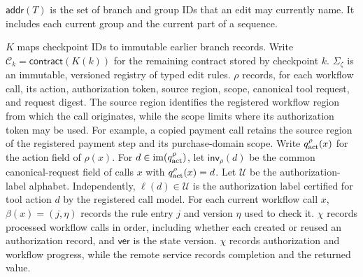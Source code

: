 \(\mathsf{addr}(T)\) is the set of branch and group IDs that an edit may currently name.
It includes each current group and the current part of a sequence.

\(K\) maps checkpoint IDs to immutable earlier branch records.
Write \(\mathcal C_k=\mathsf{contract}(K(k))\) for the remaining contract stored by checkpoint \(k\).
\(\Sigma_\zeta\) is an immutable, versioned registry of typed edit rules.
\(\rho\) records, for each workflow call, its action, authorization token, source region, scope, canonical tool request, and request digest.
The source region identifies the registered workflow region from which the call originates, while the scope limits where its authorization token may be used.
For example, a copied payment call retains the source region of the registered payment step and its purchase-domain scope.
Write \(q^{\rho}_{\rm act}(x)\) for the action field of \(\rho(x)\).
For \(d\in\operatorname{im}(q^{\rho}_{\rm act})\), let \(\mathsf{inv}_\rho(d)\) be the common canonical-request field of calls \(x\) with \(q^{\rho}_{\rm act}(x)=d\).
Let \(\mathcal U\) be the authorization-label alphabet.
Independently, \(\ell(d)\in\mathcal U\) is the authorization label certified for tool action \(d\) by the registered call model.
For each current workflow call \(x\), \(\beta(x)=(j,\eta)\) records the rule entry \(j\) and version \(\eta\) used to check it.
\(\chi\) records processed workflow calls in order, including whether each created or reused an authorization record, and \(\mathsf{ver}\) is the state version.
\(\chi\) records authorization and workflow progress, while the remote service records completion and the returned value.

